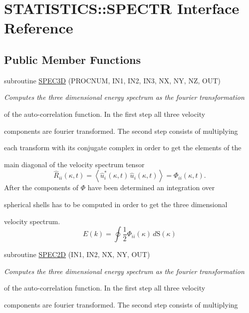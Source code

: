 \hypertarget{interfaceSTATISTICS_1_1SPECTR}{
\section{STATISTICS::SPECTR Interface Reference}
\label{interfaceSTATISTICS_1_1SPECTR}
}
\subsection*{Public Member Functions}
\begin{DoxyCompactItemize}
\item 
subroutine \hyperlink{interfaceSTATISTICS_1_1SPECTR_a806aa0960e71efcfef612b6254cf174f}{SPEC3D} (PROCNUM, IN1, IN2, IN3, NX, NY, NZ, OUT)
\begin{DoxyCompactList}\small\item\em Computes the three dimensional energy spectrum as the fourier transformation\par
 of the auto-\/correlation function. In the first step all three velocity\par
 components are fourier transformed. The second step consists of multiplying\par
 each transform with its conjugate complex in order to get the elements of the\par
 main diagonal of the velocity spectrum tensor \[\hat{R}_{ii}\left(\kappa,t\right)= \left<\hat{u}_i^{*}\left(\kappa,t\right)\,\hat{u}_i\left(\kappa,t\right)\right>= \Phi_{ii}\left(\kappa,t\right).\] After the components of $\Phi$ have been determined an integration over\par
 spherical shells has to be computed in order to get the three dimensional\par
 velocity spectrum. \[ E(k)=\oint\frac{1}{2}\Phi_{ii}(\kappa)\,d\mathrm{S}(\kappa) \] \end{DoxyCompactList}\item 
subroutine \hyperlink{interfaceSTATISTICS_1_1SPECTR_aa7d09b2b0ae1a3a1c5088312412fe0e6}{SPEC2D} (IN1, IN2, NX, NY, OUT)
\begin{DoxyCompactList}\small\item\em Computes the three dimensional energy spectrum as the fourier transformation\par
 of the auto-\/correlation function. In the first step all three velocity\par
 components are fourier transformed. The second step consists of multiplying\par

\end{DoxyCompactList}
\end{DoxyCompactItemize}
